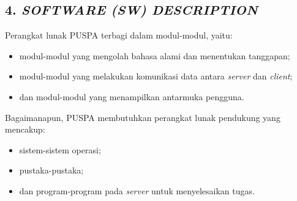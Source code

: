 \subsection*{\textcolor{subsectioncolor}{\textsf{4. \textit{SOFTWARE (SW) DESCRIPTION}}}}

Perangkat lunak PUSPA terbagi dalam modul-modul, yaitu:
\begin{itemize}
\item modul-modul yang mengolah bahasa alami dan menentukan tanggapan;
\item modul-modul yang melakukan komunikasi data antara \textit{server} dan \textit{client};
\item dan modul-modul yang menampilkan antarmuka pengguna.
\end{itemize}
Bagaimanapun, PUSPA membutuhkan perangkat lunak pendukung yang mencakup:
\begin{itemize}
\item sistem-sistem operasi;
\item pustaka-pustaka;
\item dan program-program pada \textit{server} untuk menyelesaikan tugas.
\end{itemize}
